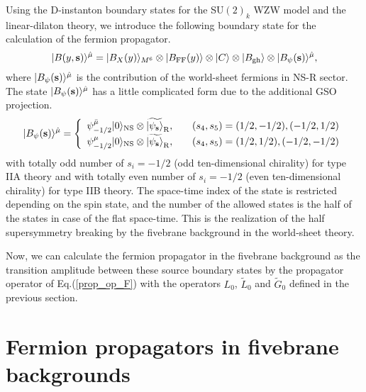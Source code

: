 \documentclass[a4paper,prd,preprint]{revtex4}
\begin{document}
Using the D-instanton boundary states
 for the SU$(2)_k$ WZW model and the linear-dilaton theory,
 we introduce the following boundary state
 for the calculation of the fermion propagator.
\begin{equation}
 | B(y,{\bf s}) \rangle^{\hat \mu}
 = | B_X(y) \rangle_{M^6} \otimes | B_{\rm FF}(y) \rangle
   \otimes | C \rangle \otimes | B_{\rm gh} \rangle
   \otimes | B_\psi({\bf s}) \rangle^{\hat \mu},
\end{equation}
where $| B_\psi({\bf s}) \rangle^{\hat \mu}$
 is the contribution of the world-sheet fermions in NS-R sector.
The state $| B_\psi({\bf s}) \rangle^{\hat \mu}$
 has a little complicated form due to the additional GSO projection.
\begin{equation}
 | B_\psi({\bf s}) \rangle^{\hat \mu}
 = \left\{
   \begin{array}{ll}
    \psi^{\bar \mu}_{-1/2} | 0 \rangle_{\rm NS}
     \otimes \widetilde{| \psi_{\bf s} \rangle}_{\rm R},
   &
    \quad (s_4, s_5) = (1/2, -1/2), (-1/2, 1/2)
   \\
    \psi^\mu_{-1/2} | 0 \rangle_{\rm NS}
     \otimes \widetilde{| \psi_{\bf s} \rangle}_{\rm R},
   &
    \quad (s_4, s_5) = (1/2, 1/2), (-1/2, -1/2)
   \end{array}
   \right.
\label{f-state}
\end{equation}
 with totally odd number of $s_i=-1/2$
 (odd ten-dimensional chirality) for type IIA theory
 and with totally even number of $s_i=-1/2$
 (even ten-dimensional chirality) for type IIB theory.
The space-time index of the state
 is restricted depending on the spin state,
 and the number of the allowed states is the half of the states
 in case of the flat space-time.
This is the realization of the half supersymmetry breaking
 by the fivebrane background in the world-sheet theory\cite{AFK}.

Now,
 we can calculate the fermion propagator in the fivebrane background
 as the transition amplitude between these source boundary states
 by the propagator operator of Eq.(\ref{prop_op_F})
 with the operators $L_0$, ${\tilde L}_0$ and ${\tilde G}_0$
 defined in the previous section.

\section{Fermion propagators in fivebrane backgrounds}
\label{sec:propagator}
\end{document}
